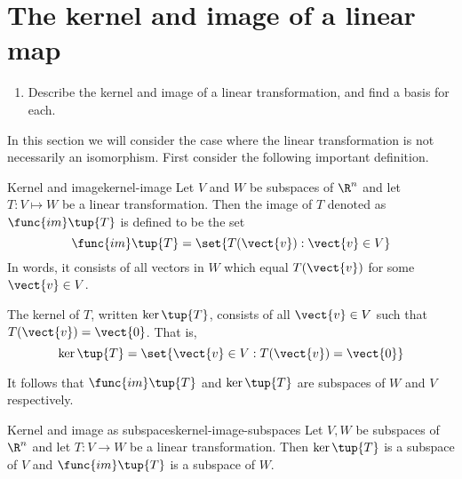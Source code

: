 \section{The kernel and image of a linear map}

\begin{outcome}
  \begin{enumerate}
  \item Describe the kernel and image of a linear transformation, and
    find a basis for each.
  \end{enumerate}
\end{outcome}

In this section we will consider the case where the linear transformation is not necessarily an
isomorphism. First consider the following important definition.

\begin{definition}{Kernel and image}{kernel-image}
Let $V$ and $W$ be subspaces of $\R^n$ and let $T:V\mapsto W$ be a linear transformation. Then the image of $T$
denoted as $\func{im}\tup{T} $ is defined to be the set 
\begin{equation*}
\func{im}\tup{T} = \set{T (\vect{v}):\vect{v}\in V}
\end{equation*}
In words, it consists of all vectors in $W$ which equal $T(\vect{v})$ for some $
\vect{v}\in V$.

The kernel of $T$, written $\ker \tup{T}$, consists of all $\vect{v}\in V$ such that $T(\vect{v})=\vect{0}$. That is, 
\begin{equation*}
\ker \tup{T} =\set{\vect{v}\in V:T(\vect{v})=\vect{0}}
\end{equation*}
\end{definition}

It follows that $\func{im}\tup{T} $ and $\ker \tup{T} $
are subspaces of $W$ and $V$ respectively.

\begin{proposition}{Kernel and image as subspaces}{kernel-image-subspaces}
Let $V, W$ be subspaces of $\R^n$ and let $T:V\rightarrow W$ be a linear transformation. Then $\ker \tup{
T} $ is a subspace of $V$ and $\func{im}\tup{T} $ is a
subspace of $W$.
\end{proposition}

